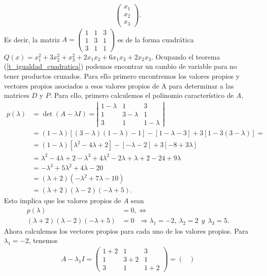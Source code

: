 \documentclass[11pt,letterpaper]{article}
\begin{document}
\begin{enumerate}
\begin{align*}
\begin{pmatrix}
x_1 \\ x_2 \\ x_3
\end{pmatrix}.
\end{align*}
Es decir, la matriz $A=\begin{pmatrix}
1 & 1 & 3\\
1 & 3 & 1\\
3 & 1 & 1 
\end{pmatrix}$ es de la forma cuadrática $Q(x)=x_1^2+3x_2^2+x_3^2+2x_1x_2+6x_1x_3+2x_2x_3$. Ocupando el teorema (\ref{t_igualdad_cuadratica}) podemos encontrar un cambio de variable para no tener productos cruzados. Para ello primero encontremos los valores propios y vectores propios asociados a esos valores propios de A para determinar a las matrices $D$ y $P$. Para ello, primero calculemos el polinomio característico de $A$,
\begin{align*}
p(\lambda) &= \det (A-\lambda I)=
\left|\begin{array}{ccc}
1-\lambda & 1 & 3 \\
1& 3-\lambda & 1\\
3 & 1 & 1-\lambda
\end{array} \right|\\
&=(1-\lambda)[(3-\lambda)(1-\lambda)-1]-[1-\lambda-3]+3[1-3(3-\lambda)]= \\
&=(1-\lambda)[\lambda^2-4\lambda+2]-[-\lambda-2]+3[-8+3\lambda]\\
&=\lambda^2-4\lambda+2-\lambda^3+4\lambda^2-2\lambda+\lambda+2-24+9\lambda\\
&=-\lambda^3+5\lambda^2+4\lambda-20\\
&=(\lambda+2)(-\lambda^2+7\lambda-10)\\
&=(\lambda+2)(\lambda-2)(-\lambda+5).
\end{align*}
Esto implica que los valores propios de $A$ sean
\begin{align*}
p(\lambda)&=0,\Leftrightarrow\\
(\lambda+2)(\lambda-2)(-\lambda+5)&=0\ \ \ \Rightarrow \lambda_1=-2, \ \lambda_2=2 \ \ y \ \ \lambda_3=5.
\end{align*}
Ahora calculemos los vectores propios para cada uno de los valores propios. Para $\lambda_1=-2$, tenemos 
\begin{align*}
A-\lambda_1I=\begin{pmatrix}
1+2 & 1 & 3\\
1 & 3+2 & 1\\
3 & 1 & 1+2 
\end{pmatrix}=\begin{pmatrix}

\end{pmatrix}
\end{align*}
\end{enumerate}
\end{document}
